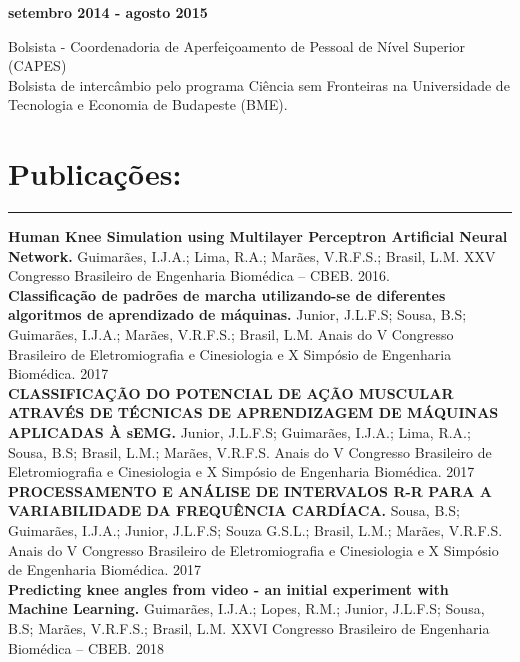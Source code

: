 \documentclass[11pt]{article}
\begin{document}
\textbf{setembro 2014 - agosto 2015}
    \begin{addmargin}{0.5cm}
        Bolsista - Coordenadoria de Aperfeiçoamento de Pessoal de Nível Superior (CAPES)\\
        Bolsista de intercâmbio pelo programa Ciência sem Fronteiras na Universidade de Tecnologia e Economia de Budapeste (BME). 
\end{addmargin}


\section{Publicações:}
\hrule \vspace{0.1cm}

\textbf{Human Knee Simulation using Multilayer Perceptron Artificial Neural Network.}
Guimarães, I.J.A.; Lima, R.A.; Marães, V.R.F.S.; Brasil, L.M.
XXV Congresso Brasileiro de Engenharia Biomédica – CBEB. 2016. \\

\textbf{Classificação de padrões de marcha utilizando-se de diferentes algoritmos de aprendizado de máquinas.}
Junior, J.L.F.S; Sousa, B.S; Guimarães, I.J.A.; Marães, V.R.F.S.; Brasil, L.M.
Anais do V Congresso Brasileiro de Eletromiografia e Cinesiologia e X Simpósio de Engenharia Biomédica. 2017 \\

\textbf{CLASSIFICAÇÃO DO POTENCIAL DE AÇÃO MUSCULAR ATRAVÉS DE TÉCNICAS DE APRENDIZAGEM 
DE MÁQUINAS APLICADAS À sEMG.}
Junior, J.L.F.S; Guimarães, I.J.A.; Lima, R.A.; Sousa, B.S; Brasil, L.M.; Marães, V.R.F.S.
Anais do V Congresso Brasileiro de Eletromiografia e Cinesiologia e X Simpósio de Engenharia Biomédica. 2017 \\

\textbf{PROCESSAMENTO E ANÁLISE DE INTERVALOS R-R PARA A VARIABILIDADE DA FREQUÊNCIA CARDÍACA.}
Sousa, B.S; Guimarães, I.J.A.; Junior, J.L.F.S; Souza G.S.L.; Brasil, L.M.; Marães, V.R.F.S.
Anais do V Congresso Brasileiro de Eletromiografia e Cinesiologia e X Simpósio de Engenharia Biomédica. 2017 \\

\textbf{Predicting knee angles from video - an initial experiment with Machine Learning.}
Guimarães, I.J.A.; Lopes, R.M.; Junior, J.L.F.S; Sousa, B.S; Marães, V.R.F.S.; Brasil, L.M.
XXVI Congresso Brasileiro de Engenharia Biomédica – CBEB. 2018 \\
\end{document}
